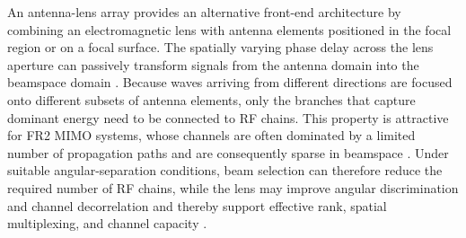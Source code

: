 

An antenna-lens array provides an alternative front-end architecture by combining an electromagnetic lens with antenna elements positioned in the focal region or on a focal surface. The spatially varying phase delay across the lens aperture can passively transform signals from the antenna domain into the beamspace domain \cite{Shen2019}. Because waves arriving from different directions are focused onto different subsets of antenna elements, only the branches that capture dominant energy need to be connected to RF chains. This property is attractive for FR2 MIMO systems, whose channels are often dominated by a limited number of propagation paths and are consequently sparse in beamspace \cite{Zeng2016}. Under suitable angular-separation conditions, beam selection can therefore reduce the required number of RF chains, while the lens may improve angular discrimination and channel decorrelation and thereby support effective rank, spatial multiplexing, and channel capacity \cite{Zeng2016}.


